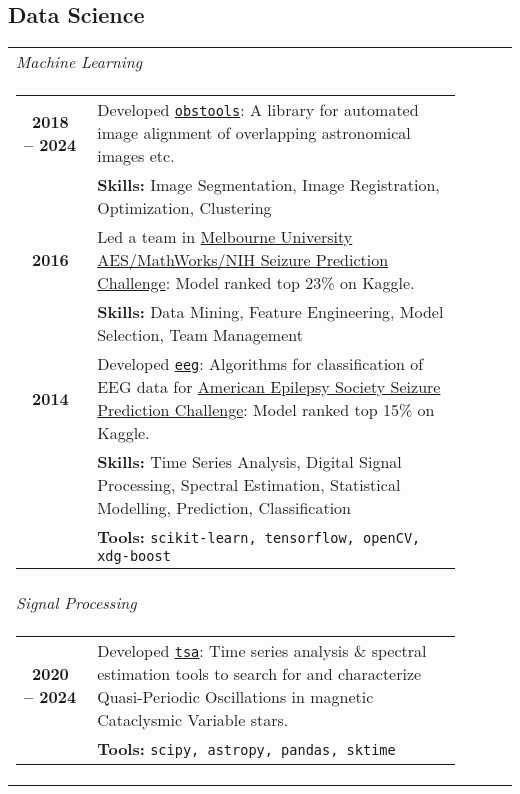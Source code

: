 \documentclass{article}
\newcommand{\tb}{\textbullet}
\begin{document}
    

\subsection*{Data Science}
\begin{tabular}{l l}
    
  \emph{\large Machine Learning} \vspace{2pt}
  \\
  \multicolumn{2}{c}{\parbox{0.95\textwidth}{
    \begin{tabular}{p{0.15\linewidth}p{0.75\linewidth}}
      \tb \ {\bf 2018 -- 2024}
      & Developed \href{https://github.com/astromancer/obstools}{\tt obstools}: A
        library for automated image alignment of overlapping astronomical images etc. \\
      & {\bf Skills:} Image Segmentation, Image Registration, Optimization, Clustering \\

      \tb \ {\bf 2016}
      & Led a team in
        \href{https://www.kaggle.com/c/melbourne-university-seizure-prediction}
              {Melbourne University AES/MathWorks/NIH Seizure Prediction Challenge}:
        Model ranked top 23\% on Kaggle.\\
      & {\bf Skills:} Data Mining, Feature Engineering, Model Selection, Team Management      \\
      
      \tb \ {\bf 2014} 
      & Developed \href{https://gitlab.com/seizures_2016/eeg}{\tt eeg}:
        Algorithms for classification of EEG data for 
        \href{https://www.kaggle.com/c/seizure-prediction}
              {American Epilepsy Society Seizure Prediction Challenge}:
        Model ranked top 15\% on Kaggle.     \\
        & {\bf Skills:} Time Series Analysis, Digital Signal Processing, 
                    Spectral Estimation, Statistical Modelling, Prediction, 
                    Classification       \\
        & {\bf Tools:} {\tt scikit-learn, tensorflow, openCV, xdg-boost}      %
      \\
    \end{tabular}
  }}
  \\

  \emph{\large Signal Processing} \vspace{2pt}
  \\
  \multicolumn{2}{c}{\parbox{0.95\textwidth}{
    \begin{tabular}{p{0.15\linewidth}p{0.75\linewidth}}
      \tb \ {\bf 2020 -- 2024}
        & {Developed  {\tt \href{https://github.com/astromancer/tsa}{tsa}}: 
           Time series analysis \& spectral estimation tools to
           search for and characterize Quasi-Periodic Oscillations in magnetic
           Cataclysmic Variable stars.} \\
        & {\bf Tools:} {\tt scipy, astropy, pandas, sktime}  \\
    \end{tabular}
  }}
  \\


\end{tabular}
\end{document}
